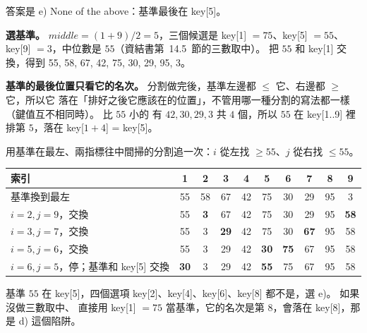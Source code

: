 \begin{pastsoln}
答案是 e) None of the above：基準最後在 key[5]。

\textbf{選基準。} $\mathit{middle} = (1 + 9) / 2 = 5$，三個候選是 key[1] $= 75$、key[5] $= 55$、
key[9] $= 3$，中位數是 $55$（資結書第~14.5~節的三數取中）。 把 $55$ 和 key[1] 交換，得到
55, 58, 67, 42, 75, 30, 29, 95, 3。

\textbf{基準的最後位置只看它的名次。} 分割做完後，基準左邊都 $\le$ 它、右邊都 $\ge$ 它，所以它
落在「排好之後它應該在的位置」，不管用哪一種分割的寫法都一樣（鍵值互不相同時）。 比 $55$ 小的
有 $42, 30, 29, 3$ 共 $4$ 個，所以 $55$ 在 key[1..9] 裡排第 $5$，落在 key[$1 + 4$] = key[5]。

用基準在最左、兩指標往中間掃的分割追一次：$i$ 從左找 $\ge 55$、$j$ 從右找 $\le 55$。
\begin{center}
\small
\begin{tabular}{l*{9}{c}}
\toprule
索引 & 1 & 2 & 3 & 4 & 5 & 6 & 7 & 8 & 9 \\
\midrule
基準換到最左 & 55 & 58 & 67 & 42 & 75 & 30 & 29 & 95 & 3 \\
$i = 2, j = 9$，交換 & 55 & \textbf{3} & 67 & 42 & 75 & 30 & 29 & 95 & \textbf{58} \\
$i = 3, j = 7$，交換 & 55 & 3 & \textbf{29} & 42 & 75 & 30 & \textbf{67} & 95 & 58 \\
$i = 5, j = 6$，交換 & 55 & 3 & 29 & 42 & \textbf{30} & \textbf{75} & 67 & 95 & 58 \\
$i = 6, j = 5$，停；基準和 key[5] 交換 & \textbf{30} & 3 & 29 & 42 & \textbf{55} & 75 & 67 & 95 & 58 \\
\bottomrule
\end{tabular}
\end{center}
基準 $55$ 在 key[5]，四個選項 key[2]、key[4]、key[6]、key[8] 都不是，選 e)。 如果沒做三數取中、
直接用 key[1] $= 75$ 當基準，它的名次是第 $8$，會落在 key[8]，那是 d) 這個陷阱。
\end{pastsoln}
